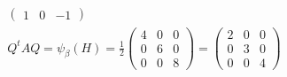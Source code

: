 \begin{enumerate}
\begin{gather}
\begin{pmatrix}
1 & 0 & -1
\end{pmatrix}\\
Q^tAQ = \psi_\beta(H)=\frac{1}{2}
\begin{pmatrix}
4 & 0 & 0\\
0 & 6 & 0\\
0 & 0 & 8
\end{pmatrix}
=
\begin{pmatrix}
2 & 0 & 0\\
0 & 3 & 0\\
0 & 0 & 4
\end{pmatrix}
\end{gather}
\end{enumerate}
